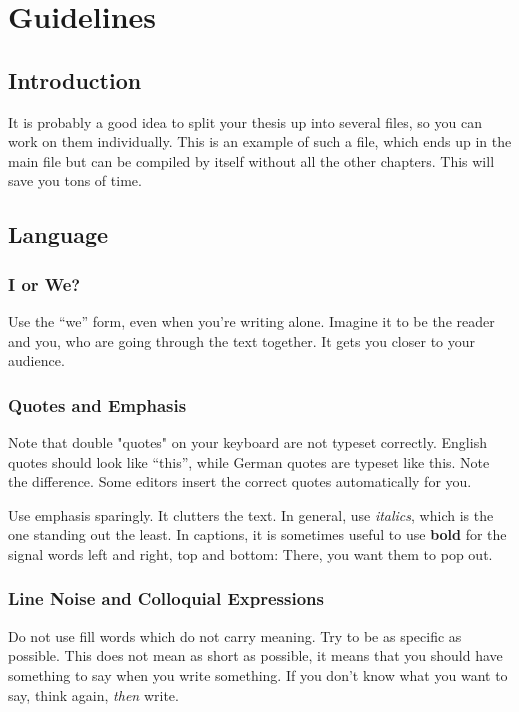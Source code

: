 \documentclass[../{{cookiecutter.project_slug}}.tex]{subfiles}
\begin{document}
\part{Guidelines}
\chapter{Introduction}
\label{chap:Introduction}

    It is probably a  good idea to split your thesis up  into several files, so
    you can  work on  them individually.  This  is an example  of such  a file,
    which ends up  in the main file  but can be compiled by  itself without all
    the other chapters.  This will save you tons of time.

\chapter{Language}

    \section{I or We?}

    Use the ``we'' form, even when  you're writing alone.  Imagine it to be
    the reader and  you, who are going through the  text together.  It gets
    you closer to your audience.

    \section{Quotes and Emphasis}
    Note that double "quotes" on  your keyboard are not typeset correctly. 
    English  quotes should  look like  ``this'', while  German quotes  are 
    typeset  like \glqq this\grqq.   Note the  difference.  Some  editors 
    insert the correct quotes automatically for you.                       

    Use  emphasis  sparingly.  It  clutters  the  text.  In  general,  use 
    \emph{italics}, which is the one standing out the least.  In captions, 
    it is sometimes useful to use  \textbf{bold} for the signal words left 
    and right, top and bottom: There, you want them to pop out.

    \section{Line Noise and Colloquial Expressions}

    Do  not use  fill words  which do  not carry  meaning.  Try  to be  as 
    specific as  possible.  This does  not mean  as short as  possible, it 
    means that you should have something to say when you write something.
    If you don't know what you want to say, think again, \emph{then} write.
\end{document}
